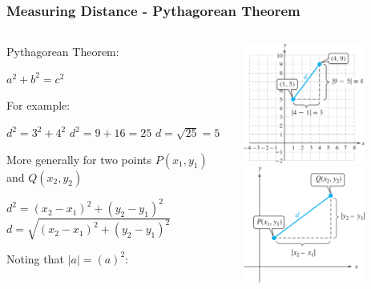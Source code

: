 \documentclass{beamer}
\begin{document}
\begin{frame}\frametitle{Measuring Distance - Pythagorean Theorem}
\begin{columns}
\begin{column}{6cm}
Pythagorean Theorem:
\begin{center}
$a^2 + b^2 = c^2$
\end{center}

For example: \newline

\hspace*{10mm}$d^2 = 3^2 + 4^2$ \newline
\hspace*{10mm}$d^2 = 9 + 16 = 25$ \newline
\hspace*{10mm}$d = \sqrt{25} = 5$ \newline

More generally for two points $P(x_1,y_1)$ and $Q(x_2,y_2)$ \newline

\hspace*{10mm}$d^2 = (x_2-x_1)^2 + (y_2 - y_1)^2$ \newline
\hspace*{10mm}$d = \sqrt{(x_2-x_1)^2 + (y_2 - y_1)^2}$ \newline

Noting that $\mid a \mid = (a)^2$: \newline


\end{column}
\begin{column}{5cm}
\begin{center}
\includegraphics[width=4cm]{fig/pythag.png}
\includegraphics[width=4cm]{fig/pythag2.png}
\end{center}
\end{column}
\end{columns}
\end{frame}
\end{document}
